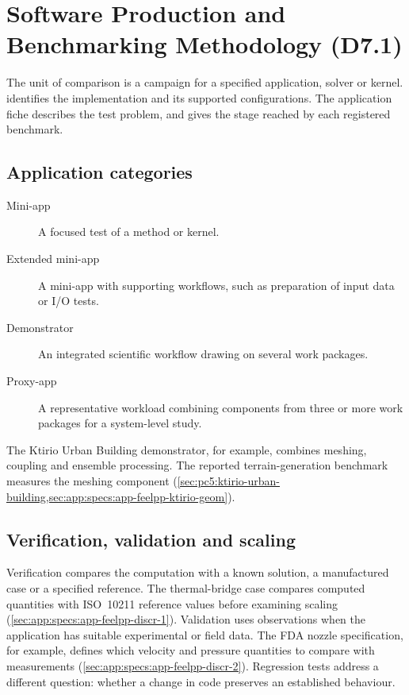 
\chapter{Software Production and Benchmarking Methodology (D7.1)}
\label{chap:methodology}

The unit of comparison is a campaign for a specified application, solver
or kernel.  identifies the implementation and its
supported configurations. The application fiche describes the test
problem, and  gives the stage reached by
each registered benchmark.

\section{Application categories}
\label{sec:benchmark-application-categories}

\begin{description}
  \item[Mini-app] A focused test of a method or kernel.
  \item[Extended mini-app] A mini-app with supporting workflows, such as
    preparation of input data or I/O tests.
  \item[Demonstrator] An integrated scientific workflow drawing on several
    work packages.
  \item[Proxy-app] A representative workload combining components from
    three or more work packages for a system-level study.
\end{description}

The Ktirio Urban Building demonstrator, for example, combines meshing,
coupling and ensemble processing. The reported terrain-generation
benchmark measures the meshing component
(\cref{sec:pc5:ktirio-urban-building,sec:app:specs:app-feelpp-ktirio-geom}).

\section{Verification, validation and scaling}
\label{sec:benchmark-protocol}

Verification compares the computation with a known solution, a
manufactured case or a specified reference. The thermal-bridge case
compares computed quantities with ISO~10211 reference values before
examining scaling (\cref{sec:app:specs:app-feelpp-discr-1}). Validation
uses observations when the application has suitable experimental or
field data. The FDA nozzle specification, for example, defines which
velocity and pressure quantities to compare with measurements
(\cref{sec:app:specs:app-feelpp-discr-2}). Regression tests address a
different question: whether a change in code preserves an established
behaviour.

